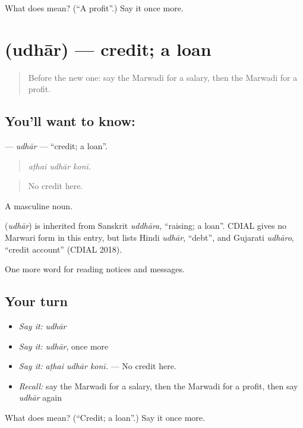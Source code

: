 \begin{tcolorbox}[breakable,colback=teal!4,colframe=teal!35!black,title={Before you move on}]
What does  mean? (\textquotedblleft{}A profit\textquotedblright{}.) Say it once more.
\end{tcolorbox}
\section[\texorpdfstring{\mw{उधार} (udhār)}{उधार (udhār)}]{ (udhār) — credit; a loan}

\label{lesson:MW-C194-udhar}



\begin{quote}
Before the new one: say the Marwadi for a salary, then the Marwadi for a profit.
\end{quote}

\subsection*{You'll want to know: }
\textbf{} — \emph{udhār} — \textquotedblleft{}credit; a loan\textquotedblright{}.

\begin{quote}
  
\end{quote}

\begin{quote}
\emph{aṭhai udhār konī.}
\end{quote}

\begin{quote}
No credit here.
\end{quote}

A masculine noun.

\begin{cousinweb}
\textbf{} (\emph{udhār}) is inherited from Sanskrit \emph{uddhāra}, \textquotedblleft{}raising; a loan\textquotedblright{}. CDIAL gives no Marwari form in this entry, but lists Hindi \emph{udhār}, \textquotedblleft{}debt\textquotedblright{}, and Gujarati \emph{udhāro}, \textquotedblleft{}credit account\textquotedblright{} (CDIAL 2018).
\end{cousinweb}

\begin{grammarlens}[title={What you've built}]
One more word for reading notices and messages.
\end{grammarlens}

\subsection*{Your turn}
\begin{itemize}
\raggedright
  \item \emph{Say it:} \emph{udhār}
  \item \emph{Say it:} \emph{udhār}, once more
  \item \emph{Say it:} \emph{aṭhai udhār konī.} — No credit here.
  \item \emph{Recall:} say the Marwadi for a salary, then the Marwadi for a profit, then say \emph{udhār} again
\end{itemize}

\begin{tcolorbox}[breakable,colback=teal!4,colframe=teal!35!black,title={Before you move on}]
What does  mean? (\textquotedblleft{}Credit; a loan\textquotedblright{}.) Say it once more.
\end{tcolorbox}
